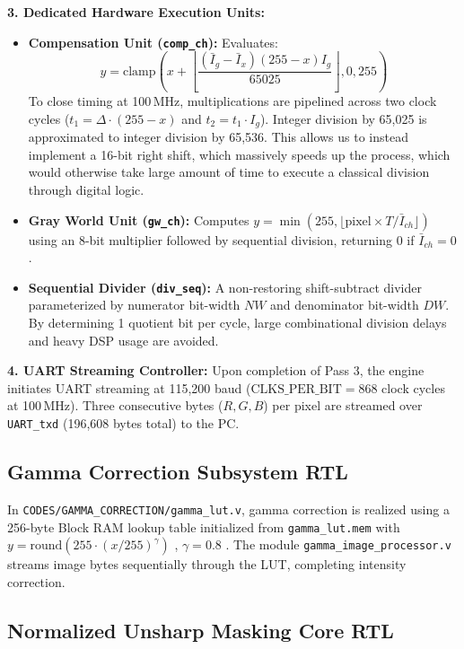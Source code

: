 \documentclass[10pt,twocolumn,letterpaper]{article}
\begin{document}
{\textbf{3. Dedicated Hardware Execution Units:}
\begin{itemize}
    \item \textbf{Compensation Unit (\texttt{comp\_ch}):} Evaluates:
    \begin{equation}
      y = \text{clamp}\!\left( x + \left\lfloor\frac{(\bar{I}_g - \bar{I}_x)(255 - x)I_g}{65025}\right\rfloor, 0, 255 \right)
      \label{eq:comp_hw_cont}
    \end{equation}
    To close timing at 100\,MHz, multiplications are pipelined across two clock cycles ($t_1 = \Delta \cdot (255-x)$ and $t_2 = t_1 \cdot I_g$). Integer division by 65,025 is approximated to integer division by 65,536. This allows us to instead implement a 16-bit right shift, which massively speeds up the process, which would otherwise take large amount of time to execute a classical division through digital logic.
    \item \textbf{Gray World Unit (\texttt{gw\_ch}):} Computes $y = \min(255, \lfloor \text{pixel} \times T / \bar{I}_{ch}\rfloor)$ using an 8-bit multiplier followed by sequential division, returning 0 if $\bar{I}_{ch} = 0$.
    \item \textbf{Sequential Divider (\texttt{div\_seq}):} A non-restoring shift-subtract divider parameterized by numerator bit-width $NW$ and denominator bit-width $DW$. By determining 1 quotient bit per cycle, large combinational division delays and heavy DSP usage are avoided.
\end{itemize}

\textbf{4. UART Streaming Controller:} Upon completion of Pass 3, the engine initiates UART streaming at 115,200 baud ($\text{CLKS\_PER\_BIT} = 868$ clock cycles at 100\,MHz). Three consecutive bytes ($R, G, B$) per pixel are streamed over \texttt{UART\_txd} (196,608 bytes total) to the PC.

\subsection{Gamma Correction Subsystem RTL}
\label{subsec:gamma_rtl}

In \texttt{CODES/GAMMA\_CORRECTION/gamma\_lut.v}, gamma correction is realized using a 256-byte Block RAM lookup table initialized from \texttt{gamma\_lut.mem} with $y = \text{round}(255 \cdot (x/255)^\gamma)$ , $\gamma = 0.8$ . 
The module \texttt{gamma\_image\_processor.v} streams image bytes sequentially through the LUT, completing intensity correction.

\subsection{Normalized Unsharp Masking Core RTL}
\label{subsec:unsharp_rtl}

}
\end{document}
